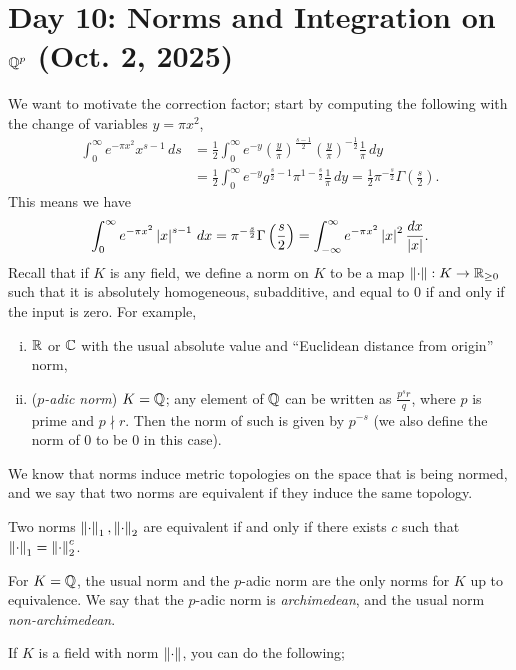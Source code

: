 \section{Day 10: Norms and Integration on \texorpdfstring{$\mathbb Q^p$}{Qp} (Oct. 2, 2025)}
We want to motivate the correction factor; start by computing the following with the change of variables $y = \pi x^2$,
\begin{align*}
    \int_0^\infty e^{-\pi x^2} x^{s - 1} \, ds &= \frac{1}{2} \int_0^\infty e^{-y} \left(\frac{y}{\pi}\right)^{\frac{s-1}{2}} \left(\frac{y}{\pi}\right)^{-\frac{1}{2}} \frac{1}{\pi} \, dy \\
    &= \frac{1}{2} \int_0^\infty e^{-y} g^{\frac{s}{2} - 1}\pi^{1 - \frac{s}{2}} \frac{1}{\pi} \, dy = \frac{1}{2} \pi^{-\frac{s}{2}} \Gamma\left(\frac{s}{2}\right).
\end{align*}
This means we have
\[ \int_0^\infty e^{-\pi x^2} \left\lvert x \right\rvert^{s-1} \, dx = \pi^{-\frac{s}{2}} \Gamma\left(\frac{s}{2}\right) = \int_{-\infty}^\infty e^{-\pi x^2} \left\lvert x \right\rvert^2 \frac{dx}{\left\lvert x \right\rvert}. \]
Recall that if $K$ is any field, we define a norm on $K$ to be a map $\left\lVert \cdot \right\rVert : K \to \mathbb R_{\geq 0}$ such that it is absolutely homogeneous, subadditive, and equal to $0$ if and only if the input is zero. For example,
\begin{enumerate}[(i)]
    \item $\mathbb R$ or $\mathbb C$ with the usual absolute value and ``Euclidean distance from origin'' norm,
    \item (\textit{$p$-adic norm}) $K = \mathbb Q$; any element of $\mathbb Q$ can be written as $\frac{p^s r}{q}$, where $p$ is prime and $p \nmid r$. Then the norm of such is given by $p^{-s}$ (we also define the norm of $0$ to be $0$ in this case).
\end{enumerate}
\noindent We know that norms induce metric topologies on the space that is being normed, and we say that two norms are equivalent if they induce the same topology.
\begin{exercise}
    Two norms $\left\lVert \cdot \right\rVert_1, \left\lVert \cdot \right\rVert_2$ are equivalent if and only if there exists $c$ such that $\left\lVert \cdot \right\rVert_1 = \left\lVert \cdot \right\rVert_2^c$. 
\end{exercise}
\begin{theorem}[Ostrowski]
    For $K = \mathbb Q$, the usual norm and the $p$-adic norm are the only norms for $K$ up to equivalence. We say that the $p$-adic norm is \textit{archimedean}, and the usual norm \textit{non-archimedean}.
\end{theorem}
\noindent If $K$ is a field with norm $\left\lVert \cdot \right\rVert$, you can do the following;
